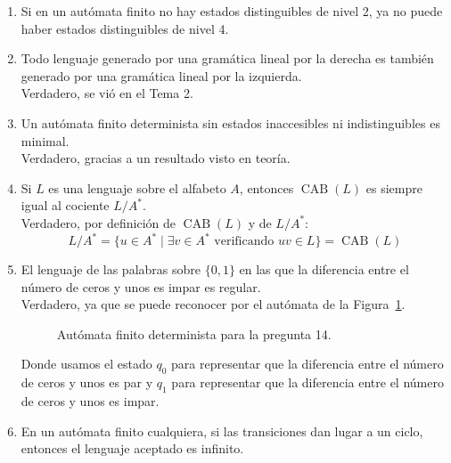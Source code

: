 \begin{enumerate}
    \item Si en un autómata finito no hay estados distinguibles de nivel 2, ya no puede haber estados distinguibles de nivel 4.\\

    \item Todo lenguaje generado por una gramática lineal por la derecha es también generado por una gramática lineal por la izquierda.\\
        
        Verdadero, se vió en el Tema 2.
    \item Un autómata finito determinista sin estados inaccesibles ni indistinguibles es minimal.\\

        Verdadero, gracias a un resultado visto en teoría.
    \item Si $L$ es una lenguaje sobre el alfabeto $A$, entonces $\operatorname{CAB}(L)$ es siempre igual al cociente $L/A^\ast$.\\

        Verdadero, por definición de $\operatorname{CAB}(L)$ y de $L/A^\ast$:
        \begin{equation*}
            L/A^\ast = \{u\in A^\ast \mid \exists v\in A^\ast \text{\ verificando\ } uv \in L\} = \operatorname{CAB}(L)
        \end{equation*}
    \item El lenguaje de las palabras sobre $\{0,1\}$ en las que la diferencia entre el número de ceros y unos es impar es regular.\\

        Verdadero, ya que se puede reconocer por el autómata de la Figura~\ref{fig:tipo_test14}.
        \begin{figure}[H]
           \centering
           \caption{Autómata finito determinista para la pregunta 14.}
           \label{fig:tipo_test14}
       \end{figure}
       Donde usamos el estado $q_0$ para representar que la diferencia entre el número de ceros y unos es par y $q_1$ para representar que la diferencia entre el número de ceros y unos es impar.
    \item En un autómata finito cualquiera, si las transiciones dan lugar a un ciclo, entonces el lenguaje aceptado es infinito.\\


\end{enumerate}
